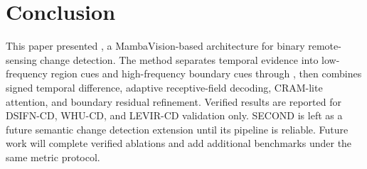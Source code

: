 \section{Conclusion}

This paper presented \ours, a MambaVision-based architecture for binary remote-sensing change detection. The method separates temporal evidence into low-frequency region cues and high-frequency boundary cues through \drbi, then combines signed temporal difference, adaptive receptive-field decoding, CRAM-lite attention, and boundary residual refinement. Verified results are reported for DSIFN-CD, WHU-CD, and LEVIR-CD validation only. SECOND is left as a future semantic change detection extension until its pipeline is reliable. Future work will complete verified ablations and add additional benchmarks under the same metric protocol.
